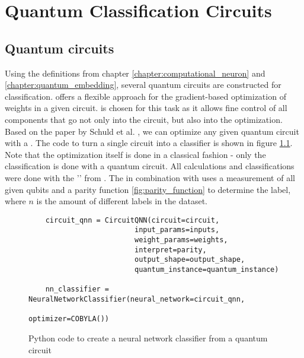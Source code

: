 
\chapter{Quantum Classification Circuits} %

\label{Chapter3}

\section{Quantum circuits}
\label{chapter:quantum_circuits}

Using the definitions from chapter \ref{chapter:computational_neuron} and \ref{chapter:quantum_embedding}, several quantum circuits are constructed for classification.  offers a flexible approach for the gradient-based optimization of weights in a given circuit.  is chosen for this task as it allows fine control of all components that go not only into the circuit, but also into the optimization. Based on the paper by Schuld et al. \cite{schuld_evaluating_2019}, we can optimize any given quantum circuit with a \cite{qiskit_neural_nodate}. The code to turn a single circuit into a classifier is shown in figure \ref{fig:code_qnn}. Note that the optimization itself is done in a classical fashion - only the classification is done with a quantum circuit. All calculations and classifications were done with the '' from . The  in combination with  uses a measurement of all given qubits and a parity function \ref{fig:parity_function} to determine the label, where $n$ is the amount of different labels in the dataset.

\begin{figure}[!ht]
    \centering
    \begin{verbatim}
    circuit_qnn = CircuitQNN(circuit=circuit,    
                         input_params=inputs,
                         weight_params=weights,
                         interpret=parity,
                         output_shape=output_shape,
                         quantum_instance=quantum_instance)

    nn_classifier = NeuralNetworkClassifier(neural_network=circuit_qnn, 
                                            optimizer=COBYLA())
    \end{verbatim}
    \caption{Python code to create a neural network classifier from a quantum circuit}
    \label{fig:code_qnn}
\end{figure}

